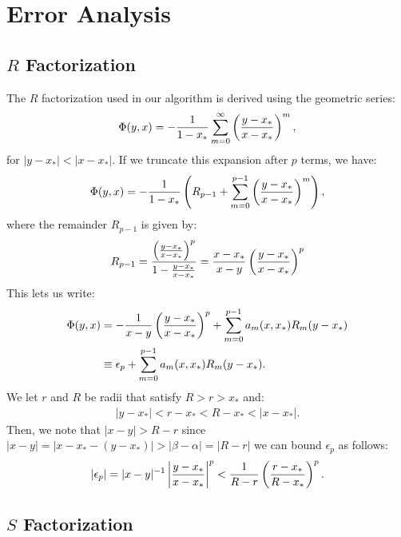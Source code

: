 \section{Error Analysis}

\subsection{$R$ Factorization}

The $R$ factorization used in our algorithm is derived using the
geometric series:
\begin{align*}
  \Phi(y, x) = -\frac{1}{1 - x_*} \sum_{m=0}^\infty \left(\frac{y - x_*}{x - x_*}\right)^m,
\end{align*}
for $|y - x_*| < |x - x_*|$. If we truncate this expansion after $p$
terms, we have:
\begin{align*}
  \Phi(y, x) = -\frac{1}{1 - x_*} \left(R_{p-1} + \sum_{m=0}^{p-1} \left(\frac{y - x_*}{x - x_*}\right)^m\right),
\end{align*}
where the remainder $R_{p-1}$ is given by:
\begin{align*}
  R_{p-1} = \frac{\left(\frac{y - x_*}{x - x_*}\right)^p}{1 - \frac{y - x_*}{x - x_*}} = \frac{x - x_*}{x - y} \left(\frac{y - x_*}{x - x_*}\right)^p
\end{align*}
This lets us write:
\begin{align*}
  \Phi(y, x) &= -\frac{1}{x - y} \left(\frac{y - x_*}{x - x_*}\right)^p + \sum_{m=0}^{p-1} a_m(x, x_*) R_m(y - x_*) \\
  &\equiv \epsilon_p + \sum_{m=0}^{p-1} a_m(x, x_*) R_m(y - x_*).
\end{align*}
We let $r$ and $R$ be radii that satisfy $R > r > x_*$ and:
\begin{align*}
  |y - x_*| < r - x_* < R - x_* < |x - x_*|.
\end{align*}
Then, we note that $|x - y| > R - r$ since
$|x - y| = |x - x_* - (y - x_*)| > |\beta - \alpha| = |R - r|$ we can
bound $\epsilon_p$ as follows:
\begin{align*}
  |\epsilon_p| = |x-y|^{-1} \left|\frac{y-x_*}{x-x_*}\right|^p < \frac{1}{R - r} \left(\frac{r - x_*}{R - x_*}\right)^p.
\end{align*}

\subsection{$S$ Factorization}

